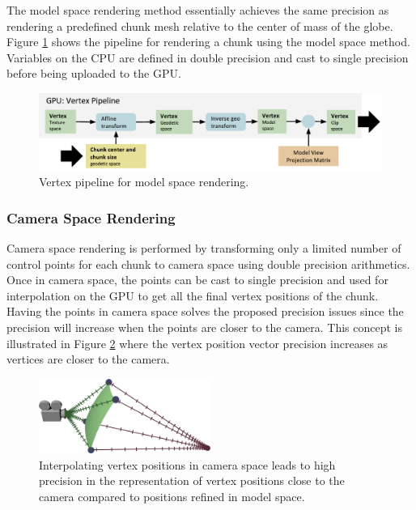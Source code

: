 The model space rendering method essentially achieves the same precision as rendering a predefined chunk mesh relative to the center of mass of the globe. Figure \ref{fig:pipelineglobal} shows the pipeline for rendering a chunk using the model space method. Variables on the CPU are defined in double precision and cast to single precision before being uploaded to the GPU.

\begin{figure}[htbp]
    \centering
    \includegraphics[width=\textwidth]{figures/implementation/rendering/pipeline_global.pdf}
    \caption{Vertex pipeline for model space rendering.}
    \label{fig:pipelineglobal}
\end{figure}

\subsubsection{Camera Space Rendering}

Camera space rendering is performed by transforming only a limited number of control points for each chunk to camera space using double precision arithmetics. Once in camera space, the points can be cast to single precision and used for interpolation on the GPU to get all the final vertex positions of the chunk. Having the points in camera space solves the proposed precision issues since the precision will increase when the points are closer to the camera. This concept is illustrated in Figure \ref{fig:local} where the vertex position vector precision increases as vertices are closer to the camera.

\begin{figure}[htbp]
    \centering
    \includegraphics[width=0.5\textwidth]{figures/implementation/rendering/local.pdf}
    \caption{Interpolating vertex positions in camera space leads to high precision in the representation of vertex positions close to the camera compared to positions refined in model space.}
    \label{fig:local}
\end{figure}

